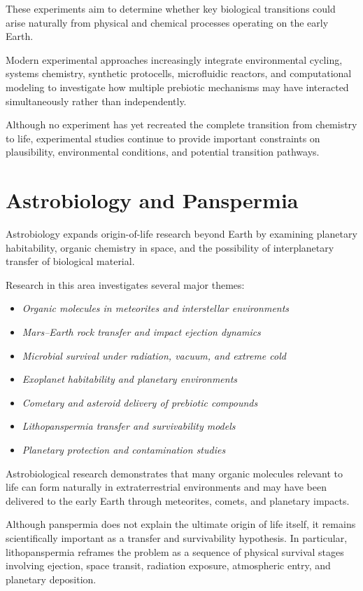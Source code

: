\documentclass[
  oneside]{book}
\providecommand{\tightlist}{%
  \setlength{\itemsep}{0pt}\setlength{\parskip}{0pt}}
\begin{document}
These experiments aim to determine whether key biological transitions could arise naturally from physical and chemical processes operating on the early Earth.

Modern experimental approaches increasingly integrate environmental cycling, systems chemistry, synthetic protocells, microfluidic reactors, and computational modeling to investigate how multiple prebiotic mechanisms may have interacted simultaneously rather than independently.

Although no experiment has yet recreated the complete transition from chemistry to life, experimental studies continue to provide important constraints on plausibility, environmental conditions, and potential transition pathways.

\section{Astrobiology and Panspermia}\label{astrobiology-and-panspermia}

Astrobiology expands origin-of-life research beyond Earth by examining planetary habitability, organic chemistry in space, and the possibility of interplanetary transfer of biological material.

Research in this area investigates several major themes:

\begin{itemize}
\tightlist
\item
  \emph{Organic molecules in meteorites and interstellar environments}
\item
  \emph{Mars--Earth rock transfer and impact ejection dynamics}
\item
  \emph{Microbial survival under radiation, vacuum, and extreme cold}
\item
  \emph{Exoplanet habitability and planetary environments}
\item
  \emph{Cometary and asteroid delivery of prebiotic compounds}
\item
  \emph{Lithopanspermia transfer and survivability models}
\item
  \emph{Planetary protection and contamination studies}
\end{itemize}

Astrobiological research demonstrates that many organic molecules relevant to life can form naturally in extraterrestrial environments and may have been delivered to the early Earth through meteorites, comets, and planetary impacts.

Although panspermia does not explain the ultimate origin of life itself, it remains scientifically important as a transfer and survivability hypothesis. In particular, lithopanspermia reframes the problem as a sequence of physical survival stages involving ejection, space transit, radiation exposure, atmospheric entry, and planetary deposition.
\end{document}
